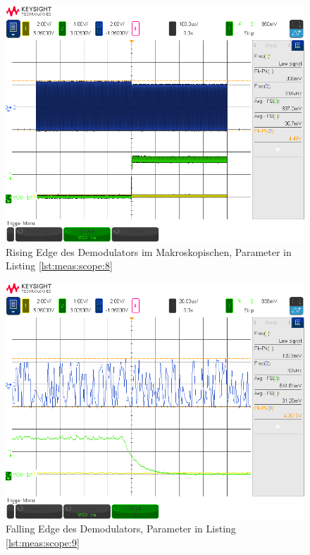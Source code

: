 \begin{figure}[h!tb]
    \centering
    \includegraphics[width=1\textwidth, trim=0mm 21mm 0mm 11mm, clip]{images/scopeShots/scope_8b.png}
    \caption{Rising Edge des Demodulators im Makroskopischen, Parameter in Listing \ref{lst:meas:scope:8}}
    \label{fig:meas:scope:8}
\end{figure}

\begin{figure}[h!tb]
    \centering
    \includegraphics[width=1\textwidth, trim=0mm 21mm 0mm 11mm, clip]{images/scopeShots/scope_9b.png}
    \caption{Falling Edge des Demodulators, Parameter in Listing \ref{lst:meas:scope:9}}
    \label{fig:meas:scope:9}
\end{figure}

